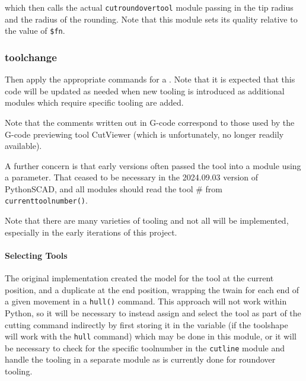\documentclass{ltxdoc}
\begin{document}
\noindent which then calls the actual \texttt{cutroundovertool} module passing in the tip radius and the radius of the rounding. Note that this module sets its quality relative to the value of \verb|$fn|.

\subsubsection{toolchange}

Then apply the appropriate commands for a \label{subsubsec:toolchange} . Note that it is expected that this code will be updated as needed when new tooling is introduced as additional modules which require specific tooling are added. 

Note that the comments written out in G-code correspond to those used by the G-code previewing tool CutViewer (which is unfortunately, no longer readily available).

A further concern is that early versions often passed the tool into a module using a parameter. That ceased to be necessary in the 2024.09.03 version of PythonSCAD, and all modules should read the tool \# from \verb|currenttoolnumber()|. %


Note that there are many varieties of tooling and not all will be implemented, especially in the early iterations of this project.
 
\paragraph{Selecting Tools}
 
The original implementation created the model for the tool at the current position, and a duplicate at the end position, wrapping the twain for each end of a given movement in a \verb|hull()| command. This approach will not work within Python, so it will be necessary to instead assign and select the tool as part of the cutting command indirectly by first storing it in the variable  (if the toolshape will work with the \verb|hull| command) which may be done in this module, or it will be necessary to check for the specific toolnumber in the \verb|cutline| module and handle the tooling in a separate module as is currently done for roundover tooling.
\end{document}

